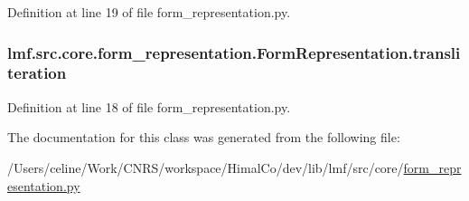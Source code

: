 Definition at line 19 of file form\+\_\+representation.\+py.

\hypertarget{classlmf_1_1src_1_1core_1_1form__representation_1_1_form_representation_ab192387108c3c4e780297d1b409d5eff}{
\subsubsection[{transliteration}]{\setlength{\rightskip}{0pt plus 5cm}lmf.\+src.\+core.\+form\+\_\+representation.\+Form\+Representation.\+transliteration}}\label{classlmf_1_1src_1_1core_1_1form__representation_1_1_form_representation_ab192387108c3c4e780297d1b409d5eff}


Definition at line 18 of file form\+\_\+representation.\+py.



The documentation for this class was generated from the following file\+:\begin{DoxyCompactItemize}
\item 
/\+Users/celine/\+Work/\+C\+N\+R\+S/workspace/\+Himal\+Co/dev/lib/lmf/src/core/\hyperlink{form__representation_8py}{form\+\_\+representation.\+py}\end{DoxyCompactItemize}
